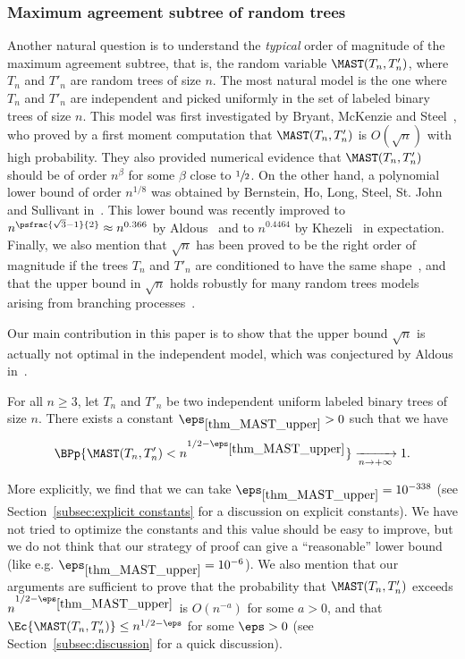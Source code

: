 \subsubsection*{Maximum agreement subtree of random trees}
Another natural question is to understand the \emph{typical} order of magnitude of the maximum agreement subtree, that is, the random variable $\MAST(T_n, T'_n)$, where $T_n$ and $T'_n$ are random trees of size $n$.
The most natural model is the one where $T_n$ and $T'_n$ are independent and picked uniformly in the set of labeled binary trees of size $n$.
This model was first investigated by Bryant, McKenzie and Steel~\cite{bryant_size_2003}, who proved by a first moment computation that $\MAST(T_n, T'_n)$ is $O(\sqrt{n})$ with high probability.
They also provided numerical evidence that $\MAST(T_n, T'_n)$ should be of order $n^{\beta}$ for some $\beta$ close to $\sfrac{1}{2}$.
On the other hand, a polynomial lower bound of order $n^{1/8}$ was obtained by Bernstein, Ho, Long, Steel, St. John and Sullivant in~\cite{bernstein_bounds_2015}. This lower bound was recently improved to $n^{\psfrac{\sqrt{3}-1}{2}}\approx n^{0.366}$ by Aldous~\cite{aldous_largest_2022} and to $n^{0.4464}$ by Khezeli~\cite{Khez22} in expectation. Finally, we also mention that $\sqrt{n}$ has been proved to be the right order of magnitude if the trees $T_n$ and $T'_n$ are conditioned to have the same shape~\cite{misra_bounds_2019}, and that the upper bound in $\sqrt{n}$ holds robustly for many random trees models arising from branching processes~\cite{Pit23}.

Our main contribution in this paper is to show that the upper bound $\sqrt{n}$ is actually not optimal in the independent model, which was conjectured by Aldous in~\cite{aldous_largest_2022}.

\begin{theorem}\label{thm_MAST_upper}
For all $n \geq 3$, let $T_n$ and $T'_n$ be two independent uniform labeled binary trees of size $n$. There exists a constant $\eps_{\ref{thm_MAST_upper}}>0$ such that we have
\[ \BPp{\MAST (T_n,T'_n) < n^{1/2-\eps_{\ref{thm_MAST_upper}}}} \xrightarrow[n \to +\infty]{} 1.\]
\end{theorem}

More explicitly, we find that we can take $\eps_{\ref{thm_MAST_upper}}=10^{-338}$ (see Section~\ref{subsec:explicit constants} for a discussion on explicit constants). We have not tried to optimize the constants and this value should be easy to improve, but we do not think that our strategy of proof can give a ``reasonable'' lower bound (like e.g. $\eps_{\ref{thm_MAST_upper}}=10^{-6}$). We also mention that our arguments are sufficient to prove that the probability that $\MAST(T_n,T'_n)$ exceeds $n^{1/2-\eps_{\ref{thm_MAST_upper}}}$ is $O(n^{-a})$ for some $a>0$, and that $\Ec{\MAST(T_n,T'_n)} \leq n^{1/2-\eps}$ for some $\eps>0$ (see Section~\ref{subsec:discussion} for a quick discussion).

